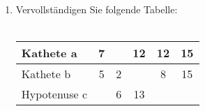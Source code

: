 \documentclass{scrartcl}
\begin{document}
	\begin{enumerate}
		\item Vervollständigen Sie folgende Tabelle: \\ \\
			\begin{tabular}[c]{|l|c|c|c|c|c|}
				\hline
				Kathete a    & 7 &   & 12 & 12 & 15 \\ \hline
				Kathete b    & 5 & 2 &    & 8  & 15 \\ \hline
				Hypotenuse c &   & 6 & 13 &    &    \\ \hline
			\end{tabular}			
	\end{enumerate} 
	
	
\end{document}
